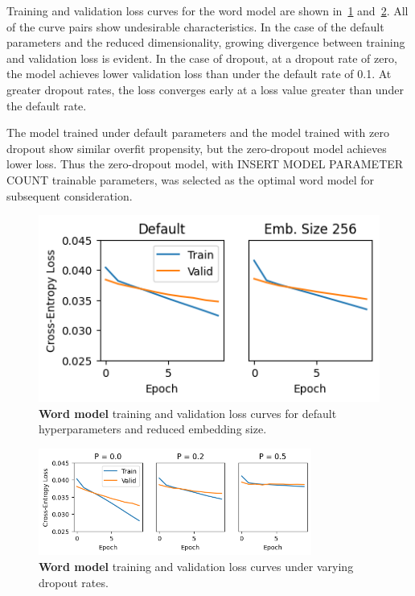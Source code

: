 \documentclass[letterpaper]{article} %
\begin{document}
\begin{NoHyper}
Training and validation loss curves for the word model are shown in~\ref{fig:onemark-loss-df} and~\ref{fig:onemark-loss-dropout}.
All of the curve pairs show undesirable characteristics.
In the case of the default parameters and the reduced dimensionality, growing divergence between training and validation loss is evident.
In the case of dropout, at a dropout rate of zero, the model achieves lower validation loss than under the default rate of 0.1. At greater dropout rates, the loss converges  early at a loss value greater than under the default rate.

The model trained under default parameters and the model trained with zero dropout show similar overfit propensity, but the zero-dropout model achieves lower loss.
Thus the zero-dropout model, with INSERT MODEL PARAMETER COUNT trainable parameters, was selected as the optimal word model for subsequent consideration.

\begin{figure}
\centering
\includegraphics[width=0.9\columnwidth]{fig-onemark-loss-default-and-embsize}
\caption{\textbf{Word model} training and validation loss curves for default hyperparameters and reduced embedding size.}
\label{fig:onemark-loss-df}
\end{figure}

\begin{figure}
\centering
\includegraphics[width=0.8\textwidth]{fig-onemark-loss-dropout}
\caption{\textbf{Word model} training and validation loss curves under varying dropout rates.}
\label{fig:onemark-loss-dropout}
\end{figure}


\end{NoHyper}
\end{document}
